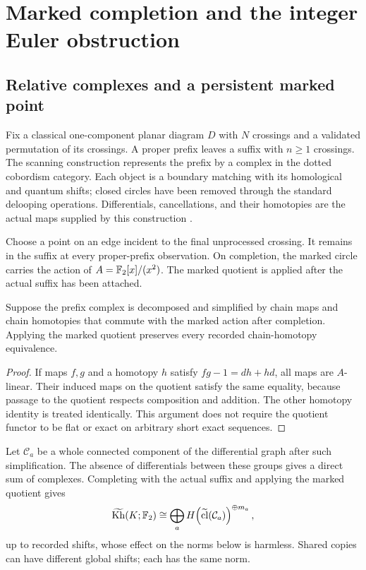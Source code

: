 \section{Marked completion and the integer Euler obstruction}
\label{sec:euler}

\subsection{Relative complexes and a persistent marked point}

Fix a classical one-component planar diagram $D$ with $N$ crossings and a
validated permutation of its crossings. A proper prefix leaves a suffix with
$n\ge1$ crossings. The scanning construction represents the prefix by a complex
in the dotted cobordism category. Each object is a boundary matching with its
homological and quantum shifts; closed circles have been removed through the
standard delooping operations. Differentials, cancellations, and their homotopies
are the actual maps supplied by this construction \cite{barnatan2005,barnatan2007}.

Choose a point on an edge incident to the final unprocessed crossing. It remains
in the suffix at every proper-prefix observation. On completion, the marked
circle carries the action of $A=\mathbb F_2[x]/(x^2)$. The marked quotient is applied
after the actual suffix has been attached.

\begin{lemma}
\label{lem:marked}
Suppose the prefix complex is decomposed and simplified by chain maps and
chain homotopies that commute with the marked action after completion. Applying
the marked quotient preserves every recorded chain-homotopy equivalence.
\end{lemma}
\begin{proof}
If maps $f,g$ and a homotopy $h$ satisfy $fg-1=dh+hd$, all maps are
$A$-linear. Their induced maps on the quotient satisfy the same equality,
because passage to the quotient respects composition and addition. The other
homotopy identity is treated identically. This argument does not require the
quotient functor to be flat or exact on arbitrary short exact sequences.
\end{proof}

Let $\mathcal C_a$ be a whole connected component of the differential graph after such
simplification. The absence of differentials between these groups gives a
direct sum of complexes. Completing with the actual suffix and applying the
marked quotient gives
\begin{equation}
 \widetilde{\operatorname{Kh}}(K;\mathbb F_2)\cong
 \bigoplus_a H\!\left(\widetilde{\operatorname{cl}}(\mathcal C_a)\right)^{\oplus m_a},
 \label{eq:completed-sum}
\end{equation}
up to recorded shifts, whose effect on the norms below is harmless. Shared
copies can have different global shifts; each has the same norm.


